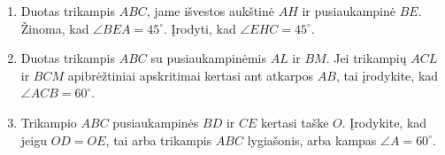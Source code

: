 \begin{enumerate}
  \item Duotas trikampis $ABC$, jame išvestos aukštinė $AH$ ir
    pusiaukampinė $BE$. Žinoma, kad $\angle BEA = 45^\circ$.
    Įrodyti, kad $\angle EHC = 45^\circ$.
  \item Duotas trikampis $ABC$ su pusiaukampinėmis $AL$ ir
    $BM$. Jei trikampių $ACL$ ir $BCM$ apibrėžtiniai
    apskritimai kertasi ant atkarpos $AB$, tai įrodykite, kad
    $\angle ACB=60^\circ$.
  \item Trikampio $ABC$ pusiaukampinės $BD$ ir $CE$ kertasi
    taške $O$. Įrodykite, kad jeigu $OD = OE$, tai arba
    trikampis $ABC$ lygiašonis, arba kampas $\angle
    A=60^\circ$.

\end{enumerate}
